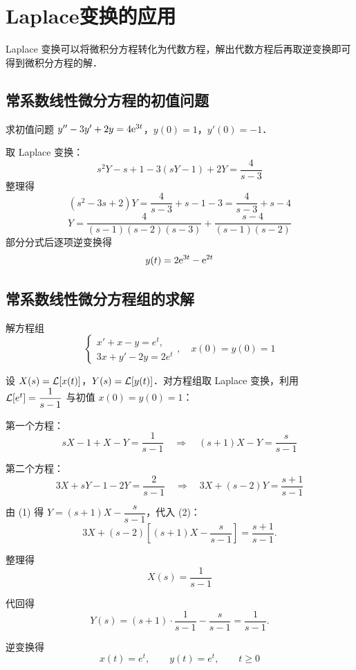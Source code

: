 \documentclass[12pt, a4paper, oneside, UTF8]{ctexbook}
\begin{document}
\section{Laplace变换的应用}

Laplace 变换可以将微积分方程转化为代数方程，解出代数方程后再取逆变换即可得到微积分方程的解．

\subsection{常系数线性微分方程的初值问题}

\begin{example}
求初值问题 $y'' - 3y' + 2y = 4\mathrm{e}^{3t}$，$y(0)=1$，$y'(0)=-1$．
\end{example}
\begin{solution}
取 Laplace 变换：
\[
s^2 Y - s + 1 - 3(sY - 1) + 2Y = \frac{4}{s-3}
\]
整理得
\[
(s^2-3s+2)Y = \frac{4}{s-3} + s - 1 - 3 = \frac{4}{s-3} + s - 4
\]
\[
Y = \frac{4}{(s-1)(s-2)(s-3)} + \frac{s-4}{(s-1)(s-2)}
\]
部分分式后逐项逆变换得
\[
y(t) = 2\mathrm{e}^{3t} - \mathrm{e}^{2t}
\]
\end{solution}

\subsection{常系数线性微分方程组的求解}

\begin{example}
解方程组
\[
\begin{cases}
    x'+x-y=e^t,\\
    3x+y'-2y=2e^t
\end{cases},\quad x(0)=y(0)=1
\]
\end{example}
\begin{solution}
    设 $X(s)=\mathcal{L}[x(t)]$，$Y(s)=\mathcal{L}[y(t)]$．对方程组取 Laplace 变换，利用 $\mathcal{L}[e^t]=\dfrac{1}{s-1}$ 与初值 $x(0)=y(0)=1$：

    第一个方程：
    \[
    sX-1+X-Y=\frac{1}{s-1}
    \quad\Longrightarrow\quad
    (s+1)X-Y=\frac{s}{s-1} \tag{1}
    \]

    第二个方程：
    \[
    3X+sY-1-2Y=\frac{2}{s-1}
    \quad\Longrightarrow\quad
    3X+(s-2)Y=\frac{s+1}{s-1} \tag{2}
    \]

    由 (1) 得 $Y=(s+1)X-\dfrac{s}{s-1}$，代入 (2)：
    \[
    3X+(s-2)\left[(s+1)X-\frac{s}{s-1}\right]=\frac{s+1}{s-1}.
    \]

    整理得
    \[
    X(s)=\frac{1}{s-1}
    \]

    代回得
    \[
    Y(s)=(s+1)\cdot\frac{1}{s-1}-\frac{s}{s-1}=\frac{1}{s-1}.
    \]

    逆变换得
    \[
    x(t)=e^t,\qquad y(t)=e^t,\qquad t\ge 0
    \]
\end{solution}
\end{document}
